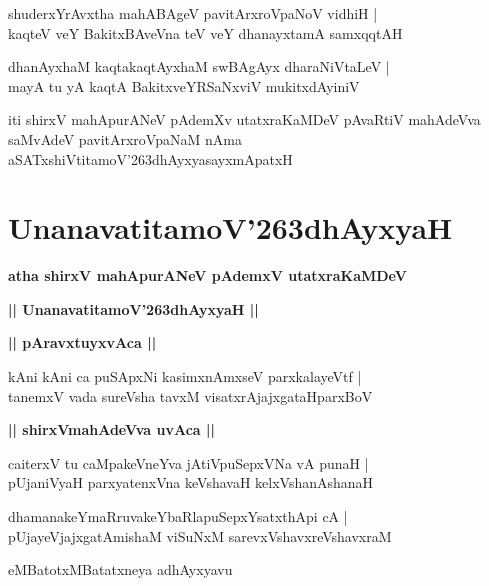 \documentclass[twoside,12pt,openright]{book}
\def\S{\char'263}
\newcounter{shloka}[chapter]
\def\uvaca#1{\centerline{{\large\textbf{#1}}}}
\begin{document}
\begin{shloka}%
shuderxYrAvxtha mahABAgeV pavitArxroVpaNoV vidhiH |\\
kaqteV veY BakitxBAveVna teV veY dhanayxtamA samxqqtAH 
\end{shloka}

\begin{shloka}%
dhanAyxhaM kaqtakaqtAyxhaM swBAgAyx dharaNiVtaLeV |\\
mayA tu yA kaqtA BakitxveYRSaNxviV mukitxdAyiniV 
\end{shloka}

\begin{center}
iti shirxV mahApurANeV pAdemXv utatxraKaMDeV pAvaRtiV mahAdeVva saMvAdeV pavitArxroVpaNaM nAma 
aSATxshiVtitamoV\S dhAyxyasayxmApatxH 
\end{center}

\chapter{UnanavatitamoV\S dhAyxyaH}

\begin{center}
{\LARGE\bfseries atha shirxV mahApurANeV pAdemxV utatxraKaMDeV}
\end{center}

\begin{center}
{\LARGE\bfseries || UnanavatitamoV\S dhAyxyaH || }
\end{center}

\uvaca{|| pAravxtuyxvAca ||}

\begin{shloka}%
kAni kAni ca puSApxNi kasimxnAmxseV parxkalayeVtf |\\
tanemxV vada sureVsha tavxM visatxrAjajxgataHparxBoV
\end{shloka}

\uvaca{|| shirxVmahAdeVva uvAca ||}

\begin{shloka}%
caiterxV tu caMpakeVneYva jAtiVpuSepxVNa vA punaH |\\
pUjaniVyaH parxyatenxVna keVshavaH kelxVshanAshanaH 
\end{shloka}

\begin{shloka}%
dhamanakeYmaRruvakeYbaRlapuSepxYsatxthApi cA |\\
pUjayeVjajxgatAmishaM viSuNxM sarevxVshavxreVshavxraM 
\end{shloka}

\begin{center}
eMBatotxMBatatxneya adhAyxyavu
\end{center}
\end{document}
